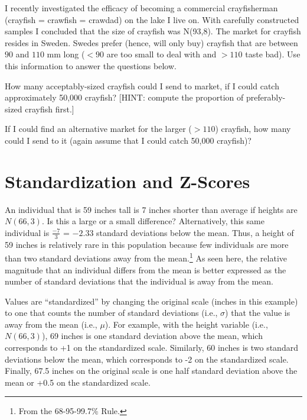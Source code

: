 \documentclass[10pt,openany]{book}\usepackage[]{graphicx}\usepackage[]{color}
\begin{document}
\begin{exsection}
  \item \label{revex:quNormCrayfish} I recently investigated the efficacy of becoming a commercial crayfisherman (crayfish = crawfish = crawdad) on the lake I live on. With carefully constructed samples I concluded that the size of crayfish was N(93,8). The market for crayfish resides in Sweden. Swedes prefer (hence, will only buy) crayfish that are between $90$ and $110$ mm long ($<90$ are too small to deal with and $>110$ taste bad).  Use this information to answer the questions below.  
\begin{Enumerate}
  \item How many acceptably-sized crayfish could I send to market, if I could catch approximately 50,000 crayfish? [HINT: compute the proportion of preferably-sized crayfish first.]
  \item If I could find an alternative market for the larger ($>110$) crayfish, how many could I send to it (again assume that I could catch 50,000 crayfish)?
\end{Enumerate}
\end{exsection}


\vspace{-12pt}
\section{Standardization and Z-Scores}\label{sect:Standardizing}
\vspace{-12pt}
An individual that is 59 inches tall is 7 inches shorter than average if heights are $N(66,3)$. Is this a large or a small difference?  Alternatively, this same individual is $\frac{-7}{3}$ = $-2.33$ standard deviations below the mean. Thus, a height of 59 inches is relatively rare in this population because few individuals are more than two standard deviations away from the mean.\footnote{From the 68-95-99.7\% Rule.} As seen here, the relative magnitude that an individual differs from the mean is better expressed as the number of standard deviations that the individual is away from the mean.

Values are ``standardized'' by changing the original scale (inches in this example) to one that counts the number of standard deviations (i.e., $\sigma$) that the value is away from the mean (i.e., $\mu$).  For example, with the height variable (i.e., $N(66,3)$), 69 inches is one standard deviation above the mean, which corresponds to +1 on the standardized scale. Similarly, 60 inches is two standard deviations below the mean, which corresponds to -2 on the standardized scale. Finally, 67.5 inches on the original scale is one half standard deviation above the mean or +0.5 on the standardized scale.
\end{document}
